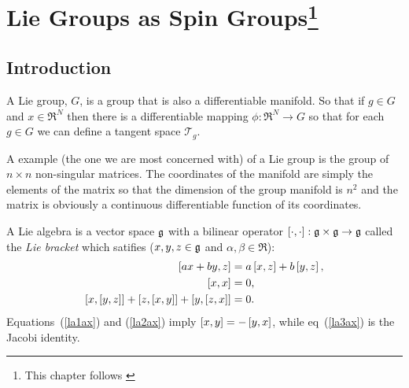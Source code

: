 \chapter[Lie Groups as Spin Groups]{Lie Groups as Spin Groups\footnote{This chapter follows \cite{DHS&VA}}}

\section{Introduction}

A Lie group, $G$, is a group that is also a differentiable manifold. So that if $g \in G$ and $x \in \Re^{N}$ then
there is a differentiable mapping $\phi:\Re^{N}\rightarrow G$ so that for each $g \in G$ we can define a tangent 
space $\mathcal{T}_{g}$.

A example (the one we are most concerned with) of a Lie group is the group of $n\times n$ non-singular matrices.  The 
coordinates of the manifold are simply the elements of the matrix so that the dimension of the group manifold is $n^{2}$
and the matrix is obviously a continuous differentiable function of its coordinates.

A Lie algebra is a vector space $\mathfrak{g}$ with a bilinear operator $\left [ {\cdot,\cdot}\right ]:\mathfrak{g}\times\mathfrak{g}\rightarrow\mathfrak{g}$
called the \emph{Lie bracket} which satifies ($x,y,z \in\mathfrak{g}$ and $\alpha,\beta\in\Re$):
\begin{align}
	\left [ {ax+by,z}\right ] &=a\left [ {x,z}\right ]+b\left [ {y,z}\right ], \label{la1ax}\\
	\left [ {x,x}\right ] &= 0, \label{la2ax}\\
	\left [ {x,\left [ {y,z}\right ]}\right ]+\left [ {z,\left [ {x,y}\right ]}\right ]+\left [ {y,\left [ {z,x}\right ]}\right ] &= 0\label{la3ax}.
\end{align}
Equations~(\ref{la1ax}) and (\ref{la2ax}) imply $\left [ {x,y}\right ] = -\left [ {y,x}\right ]$, while eq~(\ref{la3ax}) is the Jacobi identity.

